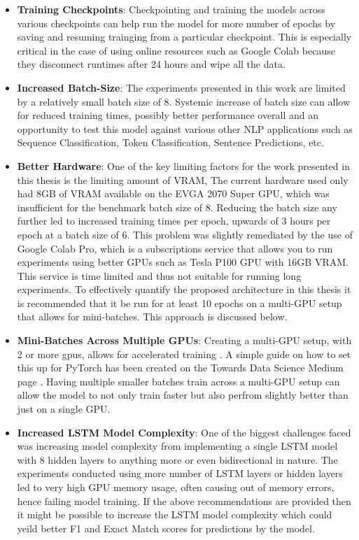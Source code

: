 \documentclass[a4paper,12pt]{report}
\begin{document}
    \begin{itemize}

    	\item \textbf{Training Checkpoints}: Checkpointing and training the models across various checkpoints can help run the model for more number of epochs by saving and resuming trainging from a particular checkpoint. This is especially critical in the case of using online resources such as Google Colab because they disconnect runtimes after 24 hours and wipe all the data.

    	\item \textbf{Increased Batch-Size}: The experiments presented in this work are limited by a relatively small batch size of 8. Systemic increase of batch size can allow for reduced training times, possibly better performance overall and an opportunity to test this model against various other NLP applications such as Sequence Classification, Token Classification, Sentence Predictions, etc.

    	\item \textbf{Better Hardware}: One of the key limiting factors for the work presented in this thesis is the limiting amount of VRAM, The current hardware used only had 8GB of VRAM available on the EVGA 2070 Super GPU, which was insufficient for the benchmark batch size of 8. Reducing the batch size any further led to increased training times per epoch, upwards of 3 hours per epoch at a batch size of 6. This problem was slightly remediated by the use of Google Colab Pro, which is a subscriptions service that allows you to run experiments using better GPUs such as Tesla P100 GPU with 16GB VRAM. This service is time limited and thus not suitable for running long experiments. To effectively quantify the proposed architecture in this thesis it is recommended that it be run for at least 10 epochs on a multi-GPU setup that allows for mini-batches. This approach is discussed below.

    	\item \textbf{Mini-Batches Across Multiple GPUs}: Creating a multi-GPU setup, with 2 or more gpus, allows for accelerated training \citep{multigpu1}. A simple guide on how to set this up for PyTorch has been created on the Towards Data Science Medium page \citep{multigpu2}. Having multiple smaller batches train across a multi-GPU setup can allow the model to not only train faster but also perfrom slightly better than just on a single GPU.

    	\item \textbf{Increased LSTM Model Complexity}: One of the biggest challenges faced was increasing model complexity from implementing a single LSTM model with 8 hidden layers to anything more or even bidirectional in nature. The experiments conducted using more number of LSTM layers or hidden layers led to very high GPU memory usage, often causing out of memory errors, hence failing model training. If the above recommendations are provided then it might be possible to increase the LSTM model complexity which could yeild better F1 and Exact Match scores for predictions by the model.
    \end{itemize}
\end{document}

